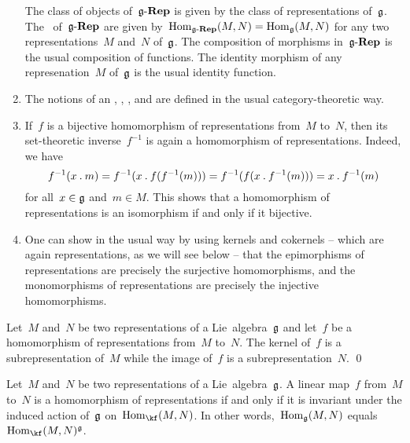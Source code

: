 \begin{remark}
\begin{enumerate}
			The class of objects of~$\mathfrak{g}\text{-}\mathbf{Rep}$ is given by the class of representations of~$\mathfrak{g}$.
			The~\spaces{$\Hom$} of~$\mathfrak{g}\text{-}\mathbf{Rep}$ are given by~$\operatorname{Hom}_{\mathfrak{g}\text{-}\mathbf{Rep}}(M, N) = \operatorname{Hom}_{\mathfrak{g}}(M,N)$ for any two representations~$M$ and~$N$ of~$\mathfrak{g}$.
			The composition of morphisms in~$\mathfrak{g}\text{-}\mathbf{Rep}$ is the usual composition of functions.
			The identity morphism of any represenation~$M$ of~$\mathfrak{g}$ is the usual identity function.
		\item
			The notions of an , , ,  and  are defined in the usual category-theoretic way.
		\item
			If~$f$ is a bijective homomorphism of representations from~$M$ to~$N$, then its set-theoretic inverse~$f^{-1}$ is again a homomorphism of representations.
			Indeed, we have
			\[
				f^{-1}(x \mathbin{.} m)
				=
				f^{-1}(x \mathbin{.} f(f^{-1}(m)))
				=
				f^{-1}(f(x \mathbin{.} f^{-1}(m)))
				=
				x \mathbin{.} f^{-1}(m)
			\]
			for all~$x \in \mathfrak{g}$ and~$m \in M$.
			This shows that a homomorphism of representations is an isomorphism if and only if it bijective.
		\item
			One can show in the usual way by using kernels and cokernels -- which are again representations, as we will see below -- that the epimorphisms of representations are precisely the surjective homomorphisms, and the monomorphisms of representations are precisely the injective homomorphisms.
	\end{enumerate}
\end{remark}


\begin{lemma}
	Let~$M$ and~$N$ be two representations of a Lie~algebra~$\mathfrak{g}$ and let~$f$ be a homomorphism of representations from~$M$ to~$N$.
	The kernel of~$f$ is a subrepresentation of~$M$ while the image of~$f$ is a subrepresentation~$N$.
	\qed
\end{lemma}


\begin{proposition}
	\label{homomorphisms of representations as invariants}
	Let~$M$ and~$N$ be two representations of a Lie~algebra~$\mathfrak{g}$.
	A linear map~$f$ from~$M$ to~$N$ is a homomorphism of representations if and only if it is invariant under the induced action of~$\mathfrak{g}$ on~$\Hom_{\kf}(M,N)$.
	In other words,~$\operatorname{Hom}_{\mathfrak{g}}(M, N)$ equals~$\Hom_{\kf}(M,N)^{\glie}$.
\end{proposition}


